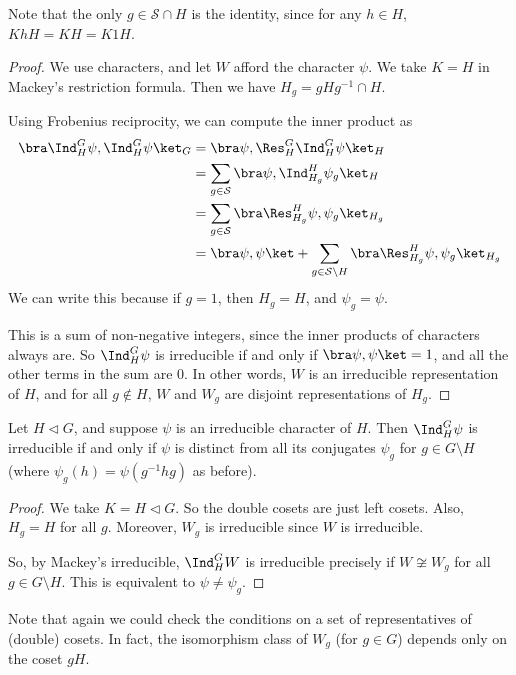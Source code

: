 \documentclass[a4paper]{article}
\begin{document}
Note that the only $g \in \mathcal{S} \cap H$ is the identity, since for any $h \in H$, $KhH = KH = K1H$.

\begin{proof}
  We use characters, and let $W$ afford the character $\psi$. We take $K = H$ in Mackey's restriction formula. Then we have $H_g = gHg^{-1} \cap H$.

  Using Frobenius reciprocity, we can compute the inner product as
  \begin{align*}
    \bra \Ind_H^G \psi, \Ind_H^G \psi\ket_G &= \bra \psi, \Res_H^G \Ind_H^G \psi\ket_H\\
    &= \sum_{g \in \mathcal{S}} \bra \psi, \Ind_{H_g}^H \psi_g\ket_H\\
    &= \sum_{g \in \mathcal{S}} \bra \Res_{H_g}^H \psi , \psi_g\ket_{H_g}\\
    &= \bra\psi, \psi\ket + \sum_{g \in \mathcal{S} \setminus H} \bra \Res_{H_g}^H \psi, \psi_g \ket_{H_g}
  \end{align*}
  We can write this because if $g = 1$, then $H_g = H$, and $\psi_g = \psi$.

  This is a sum of non-negative integers, since the inner products of characters always are. So $\Ind_H^G \psi$ is irreducible if and only if $\bra \psi, \psi\ket = 1$, and all the other terms in the sum are $0$. In other words, $W$ is an irreducible representation of $H$, and for all $g \not \in H$, $W$ and $W_g$ are disjoint representations of $H_g$.
\end{proof}

\begin{cor}
  Let $H \lhd G$, and suppose $\psi$ is an irreducible character of $H$. Then $\Ind_H^G \psi$ is irreducible if and only if $\psi$ is distinct from all its conjugates $\psi_g$ for $g \in G \setminus H$ (where $\psi_g(h) = \psi(g^{-1}hg)$ as before).
\end{cor}

\begin{proof}
  We take $K = H \lhd G$. So the double cosets are just left cosets. Also, $H_g = H$ for all $g$. Moreover, $W_g$ is irreducible since $W$ is irreducible.

  So, by Mackey's irreducible, $\Ind_H^G W$ is irreducible precisely if $W \not\cong W_g$ for all $g \in G \setminus H$. This is equivalent to $\psi \not= \psi_g$.
\end{proof}

Note that again we could check the conditions on a set of representatives of (double) cosets. In fact, the isomorphism class of $W_g$ (for $g \in G$) depends only on the coset $gH$.
\end{document}
